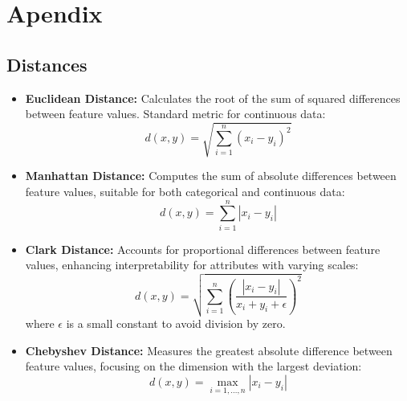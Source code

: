 \section*{Apendix}\label{apendix}
\subsection*{Distances}
\begin{itemize}
    \item \textbf{Euclidean Distance:} Calculates the root of the sum of squared differences between feature values. Standard metric for continuous data:
    \[
    d(x, y) = \sqrt{\sum_{i=1}^{n} (x_i - y_i)^2}
    \]
    \item \textbf{Manhattan Distance:} Computes the sum of absolute differences between feature values, suitable for both categorical and continuous data:
    \[
    d(x, y) = \sum_{i=1}^{n} |x_i - y_i|
    \]
    \item \textbf{Clark Distance:} Accounts for proportional differences between feature values, enhancing interpretability for attributes with varying scales:
    \[
    d(x, y) = \sqrt{\sum_{i=1}^{n} \left(\frac{|x_i - y_i|}{x_i + y_i + \epsilon}\right)^2}
    \]
    where $\epsilon$ is a small constant to avoid division by zero.
    \item \textbf{Chebyshev Distance:} Measures the greatest absolute difference between feature values, focusing on the dimension with the largest deviation:
    \[
    d(x, y) = \max_{i=1, \dots, n} |x_i - y_i|
    \]
\end{itemize}

